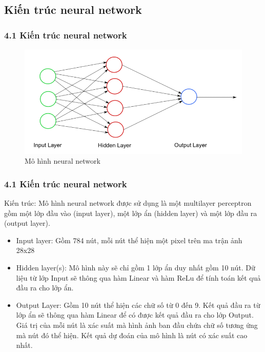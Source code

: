 \documentclass{beamer}
\begin{document}
\subsection{Kiến trúc neural network} 

\begin{frame}
\frametitle{4.1 Kiến trúc neural network}
\begin{figure}
    \centering
    \includegraphics[width=1\linewidth]{images/neuralnet-visible.png}
    \caption{Mô hình neural network}
\end{figure}
\end{frame}

\begin{frame}
\frametitle{4.1 Kiến trúc neural network}
Kiến trúc: Mô hình neural network được sử dụng là một multilayer perceptron gồm một lớp đầu vào (input layer), một lớp ẩn (hidden layer) và một lớp đầu ra (output layer). 
    \begin{itemize}
    \item Input layer: Gồm 784 nút, mỗi nút thể hiện một pixel trên ma trận ảnh 28x28
    \item Hidden layer(s): Mô hình này sẽ chỉ gồm 1 lớp ẩn duy nhất gồm 10 nút. Dữ liệu từ lớp Input sẽ thông qua hàm Linear và hàm ReLu để tính toán kết quả đầu ra cho lớp ẩn. 
    \item Output Layer: Gồm 10 nút thể hiện các chữ số từ 0 đến 9. Kết quả đầu ra từ lớp ẩn sẽ thông qua hàm Linear để có được kết quả đầu ra cho lớp Output. Giá trị của mỗi nút là xác suất mà hình ảnh ban đầu chứa chữ số tương ứng mà nút đó thể hiện. Kết quả dự đoán của mô hình là nút có xác suất cao nhất. 
    \end{itemize}
\end{frame}
\end{document}
